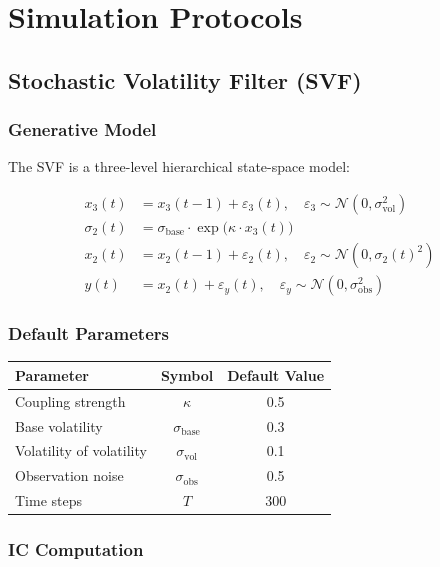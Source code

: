 \documentclass[10pt]{article} %
\theoremstyle{plain}
\theoremstyle{definition}
\begin{document}
\section{Simulation Protocols}
\label{app:protocols}

\subsection{Stochastic Volatility Filter (SVF)}

\subsubsection{Generative Model}

The SVF is a three-level hierarchical state-space model:

\begin{align}
x_3(t) &= x_3(t-1) + \varepsilon_3(t), \quad \varepsilon_3 \sim \mathcal{N}(0, \sigma_{\text{vol}}^2) \label{eq:svf-vol}\\
\sigma_2(t) &= \sigma_{\text{base}} \cdot \exp\bigl(\kappa \cdot x_3(t)\bigr) \label{eq:svf-coupling}\\
x_2(t) &= x_2(t-1) + \varepsilon_2(t), \quad \varepsilon_2 \sim \mathcal{N}(0, \sigma_2(t)^2) \label{eq:svf-state}\\
y(t) &= x_2(t) + \varepsilon_y(t), \quad \varepsilon_y \sim \mathcal{N}(0, \sigma_{\text{obs}}^2) \label{eq:svf-obs}
\end{align}

\subsubsection{Default Parameters}

\begin{center}
\begin{tabular}{lcc}
\toprule
Parameter & Symbol & Default Value \\
\midrule
Coupling strength & $\kappa$ & 0.5 \\
Base volatility & $\sigma_{\text{base}}$ & 0.3 \\
Volatility of volatility & $\sigma_{\text{vol}}$ & 0.1 \\
Observation noise & $\sigma_{\text{obs}}$ & 0.5 \\
Time steps & $T$ & 300 \\
\bottomrule
\end{tabular}
\end{center}

\subsubsection{IC Computation}
\end{document}
